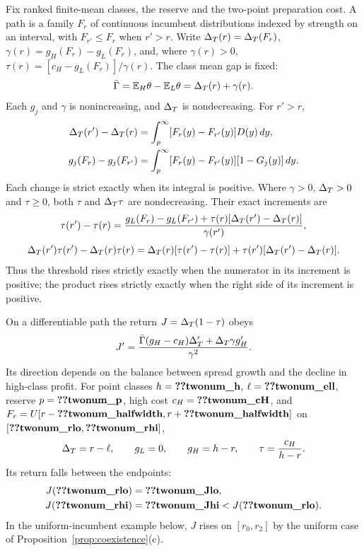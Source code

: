 \begin{lemma}\label{lem:twonumbers}
Fix ranked finite-mean classes, the reserve and the two-point preparation cost. A path is a family \(F_r\) of
continuous incumbent distributions indexed by strength on an interval, with \(F_{r'}\le F_r\) when \(r'>r\). Write
\(\Delta_T(r)=\Delta_T(F_r)\), \(\gamma(r)=g_H(F_r)-g_L(F_r)\), and, where \(\gamma(r)>0\),
\(\tau(r)=[c_H-g_L(F_r)]/\gamma(r)\). The class mean gap is fixed:
\[
\bar\Gamma=\mathbb{E}_H\theta-\mathbb{E}_L\theta=\Delta_T(r)+\gamma(r).
\]
Each \(g_j\) and \(\gamma\) is nonincreasing, and \(\Delta_T\) is nondecreasing. For \(r'>r\),
\[
\begin{aligned}
\Delta_T(r')-\Delta_T(r)&=\int_p^\infty[F_r(y)-F_{r'}(y)]D(y)\,dy,\\
g_j(F_r)-g_j(F_{r'})&=\int_p^\infty[F_r(y)-F_{r'}(y)][1-G_j(y)]\,dy.
\end{aligned}
\]
Each change is strict exactly when its integral is positive. Where \(\gamma>0\), \(\Delta_T>0\) and \(\tau\ge0\), both
\(\tau\) and \(\Delta_T\tau\) are nondecreasing. Their exact increments are
\[
\tau(r')-\tau(r)=
\frac{g_L(F_r)-g_L(F_{r'})+\tau(r)[\Delta_T(r')-\Delta_T(r)]}{\gamma(r')},
\]
\[
\Delta_T(r')\tau(r')-\Delta_T(r)\tau(r)
=\Delta_T(r)[\tau(r')-\tau(r)]+\tau(r')[\Delta_T(r')-\Delta_T(r)].
\]
Thus the threshold rises strictly exactly when the numerator in its increment is positive; the product rises
strictly exactly when the right side of its increment is positive.

On a differentiable path the return \(J=\Delta_T(1-\tau)\) obeys
\[
J'=\frac{\bar\Gamma(g_H-c_H)\Delta_T'+\Delta_T\gamma g_H'}{\gamma^2}.
\]
Its direction depends on the balance between spread growth and the decline in high-class profit. For point
classes \(h=\reg{twonum_h}\), \(\ell=\reg{twonum_ell}\), reserve \(p=\reg{twonum_p}\), high cost
\(c_H=\reg{twonum_cH}\), and \(F_r=U[r-\reg{twonum_halfwidth},r+\reg{twonum_halfwidth}]\) on
\([\reg{twonum_rlo},\reg{twonum_rhi}]\),
\[
\Delta_T=r-\ell,\qquad g_L=0,\qquad g_H=h-r,\qquad \tau=\frac{c_H}{h-r}.
\]
Its return falls between the endpoints:
\[
\begin{aligned}
J(\reg{twonum_rlo})&=\reg{twonum_Jlo},\\
J(\reg{twonum_rhi})&=\reg{twonum_Jhi}<J(\reg{twonum_rlo}).
\end{aligned}
\]
In the uniform-incumbent example below, \(J\) rises on \([r_0,r_2]\) by the uniform case of
Proposition~\ref{prop:coexistence}(c).
\end{lemma}

